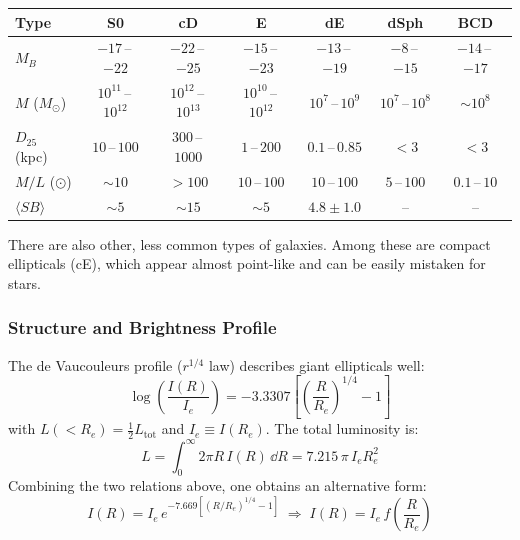 \begin{center}
\renewcommand{\arraystretch}{1.25}
\footnotesize
\begin{tabular}{l|cccccc}
    \textbf{Type} & \textbf{S0} & \textbf{cD} & \textbf{E} & \textbf{dE} & \textbf{dSph} & \textbf{BCD} \\
    \midrule
    $M_B$          & $-17$\,--\,$-22$      & $-22$\,--\,$-25$      & $-15$\,--\,$-23$      & $-13$\,--\,$-19$     & $-8$\,--\,$-15$     & $-14$\,--\,$-17$     \\
    $M$ ($M_\odot$)      & $10^{11}$\,--\,$10^{12}$ & $10^{12}$\,--\,$10^{13}$ & $10^{10}$\,--\,$10^{12}$ & $10^{7}$\,--\,$10^{9}$ & $10^{7}$\,--\,$10^{8}$ & $\sim 10^8$          \\
    $D_{25}$ (kpc)           & $10$\,--\,$100$        & $300$\,--\,$1000$     & $1$\,--\,$200$         & $0.1$\,--\,$0.85$       & $<3$                  & $<3$                  \\
    $M/L$ ($\odot$) & $\sim 10$             & $>100$                & $10$\,--\,$100$        & $10$\,--\,$100$         & $5$\,--\,$100$         & $0.1$\,--\,$10$       \\
    $\langle S\!B\rangle$ & $\sim 5$         & $\sim 15$             & $\sim 5$              & $4.8 \pm 1.0$           & --                     & --          
\end{tabular}

\end{center}

There are also other, less common types of galaxies. Among these are compact ellipticals (cE), which appear almost point-like and can be easily mistaken for stars.

\subsubsection{Structure and Brightness Profile}

The de Vaucouleurs profile ($r^{1/4}$ law) describes giant ellipticals well:
$$
\log\left(\frac{I(R)}{I_e}\right) = -3.3307\left[\left(\frac{R}{R_e}\right)^{1/4} - 1\right]
$$
with $L(<R_e) = \frac{1}{2}L_\mathrm{tot}$ and $I_e \equiv I(R_e)$. The total luminosity is:
$$
L = \int_0^\infty 2\pi R\,I(R)\,\dd{R} = 7.215\,\pi\,I_e R_e^2
$$
Combining the two relations above, one obtains an alternative form:
$$
I(R) = I_e\,e^{-7.669\left[(R/R_e)^{1/4} - 1\right]} \;\Longrightarrow\; I(R) = I_e\,f\!\left(\frac{R}{R_e}\right)
$$

